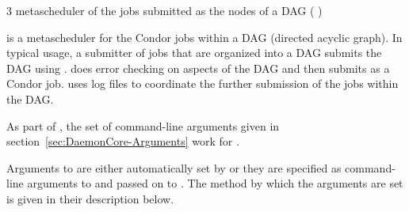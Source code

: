 \begin{ManPage}{\label{man-condor-dagman}}{3}
{metascheduler of the jobs submitted as the nodes of a DAG}
\Synopsis {}
( \Bar {})


\Description
{} is a metascheduler for the Condor jobs within
a DAG (directed acyclic graph).
In typical usage,
a submitter of jobs that are organized into a DAG submits the
DAG using .
 does error checking on aspects of the DAG
and then submits  as a Condor job.
 uses log files to coordinate the further 
submission of the jobs within the DAG.

As part of , the set of command-line arguments
given in
section~\ref{sec:DaemonCore-Arguments}
work for .

Arguments to  are either automatically set
by  
or they are specified as command-line arguments to 
and passed on to .
The method by which the arguments are set is
given in their description below.



\end{ManPage}
